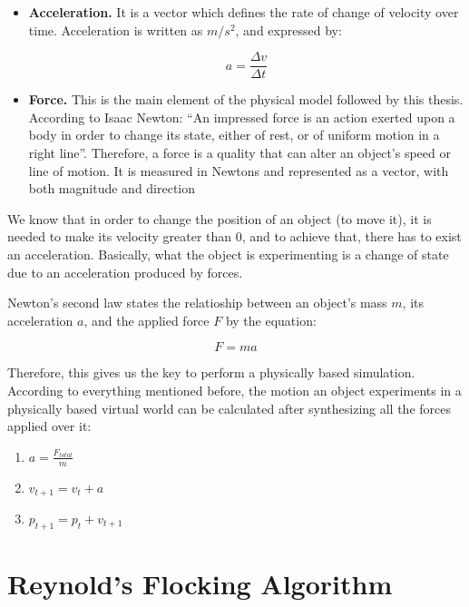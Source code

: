\begin{itemize}
\item{{\bf Acceleration.} It is a vector which defines the rate of change of velocity over time. Acceleration is written as $m/s^2$, and expressed by:}

\begin{equation}
  a=\frac{\Delta v}{\Delta t}
\end{equation}

\item{{\bf Force.} This is the main element of the physical model followed by this thesis. 
 According to Isaac Newton: ``An impressed force is an action exerted upon a body in order to change its state, either of rest, or of uniform motion in a right line''.
 Therefore, a force is a quality that can alter an object's speed or line of motion. It is measured in Newtons and represented as a vector, with both magnitude and direction}

\end{itemize}

We know that in order to change the position of an object (to move it), it is needed to make its velocity greater than 0, and to achieve that, there has to exist an acceleration. Basically, what the object is experimenting is a change of state due to an acceleration produced by forces.

Newton's second law states the relatioship between an object's mass $m$, its acceleration $a$, and the applied force $F$ by the equation:

\begin{equation}
  F=ma
\end{equation}

Therefore, this gives us the key to perform a physically based simulation. According to everything mentioned before, the motion an object experiments in a physically based virtual world can be calculated after synthesizing all the forces applied over it:

\begin{enumerate}
\item $a = \frac{F_{total}}{m}$
\item $v_{t+1} = v_{t}+a$
\item $p_{t+1} = p_{t}+v_{t+1}$
\end{enumerate}

\section{Reynold's Flocking Algorithm}

